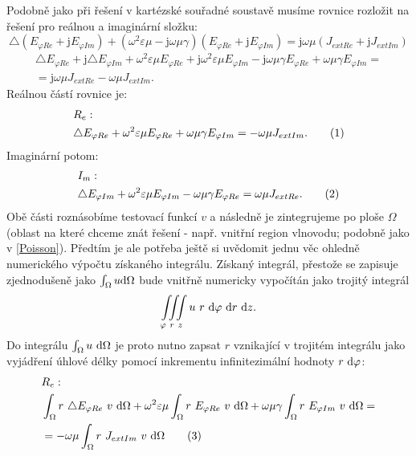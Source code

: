 \documentclass[12pt,a4paper,oneside]{article}
\numberwithin{equation}{section} %
\numberwithin{figure}{section} %
\numberwithin{table}{section} %
\newcommand{\mj}{\mathrm{j}} %
\newcommand\numberthis{\addtocounter{equation}{1}\tag{\theequation}}
\begin{document}
Podobně jako při řešení v kartézské souřadné soustavě musíme rovnice rozložit na řešení pro reálnou a imaginární složku:
\begin{equation}
\triangle (E _{\varphi Re} + \mj E _{\varphi Im}) + (\omega ^2 \varepsilon \mu - \mj \omega \mu \gamma) (E _{\varphi Re} + \mj E _{\varphi Im}) = \mj \omega \mu (J _{extRe} + \mj J _{extIm})
\end{equation}
\begin{equation}
\begin{split}
\triangle E _{\varphi Re} + \mj \triangle E _{\varphi Im} + \omega ^2 \varepsilon \mu E_ {\varphi Re} + \mj \omega ^2 \varepsilon \mu E _{\varphi Im} - \mj \omega \mu \gamma E _{\varphi Re} + \omega \mu \gamma E _{\varphi Im} =\\
= \mj \omega \mu J _{extRe} - \omega \mu J _{extIm} .
\end{split}
\end{equation}
Reálnou částí rovnice je:
\begin{align*}
&R_{e}:
\\
&\triangle E_ {\varphi Re} + \omega ^2 \varepsilon \mu E_ {\varphi Re} + \omega \mu \gamma E _{\varphi Im} = - \omega \mu J _{extIm} .
\numberthis
\end{align*}
Imaginární potom:
\begin{align*}
&I_{m}:
\\
&\triangle E _{\varphi Im} + \omega ^2 \varepsilon \mu E _{\varphi Im} - \omega \mu \gamma E _{\varphi Re} = \omega \mu J _{extRe} .
\numberthis
\end{align*}
Obě části roznásobíme testovací funkcí $v$ a následně je  zintegrujeme po ploše $\Omega$ (oblast na které chceme znát řešení - např. vnitřní region vlnovodu; podobně jako v \ref{Poisson}). Předtím je ale potřeba ještě si uvědomit jednu věc ohledně numerického výpočtu získaného integrálu. Získaný integrál, přestože se zapisuje zjednodušeně jako $\int _{\Omega} u \mathrm{d} \Omega$ bude vnitřně numericky vypočítán jako trojitý integrál 
\begin{equation}
\iiint \limits_{\varphi ~ r ~ z} u ~ r ~ \mathrm{d} \varphi ~ \mathrm{d} r ~ \mathrm{d} z . 
\end{equation}
Do integrálu $\int _{\Omega} u ~ \mathrm{d} \Omega$ je proto nutno zapsat $r$ vznikající v trojitém integrálu jako vyjádření úhlové délky pomocí inkrementu infinitezimální hodnoty $r ~ \mathrm{d} \varphi$: 
\begin{align*}
&R_e:
\\
&\int _{\Omega} r ~ \triangle E _{\varphi Re} ~ v ~ \ud \Omega + \omega ^2 \varepsilon \mu \int _{\Omega} r ~ E _{\varphi Re} ~ v ~ \ud \Omega +  \omega \mu \gamma \int _{\Omega} r ~ E _{\varphi Im} ~ v ~ \ud \Omega =\\
&= - \omega \mu \int _{\Omega} r ~ J _{extIm} ~ v ~ \ud \Omega
\numberthis
\end{align*}
\end{document}
